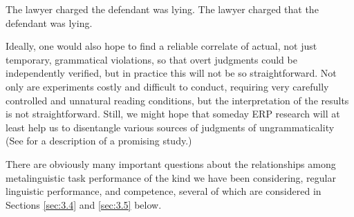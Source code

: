 \ea\label{ex:3:2}
\ea The lawyer charged the defendant was lying.
\ex The lawyer charged that the defendant was lying.
\z
\z

\noindent
Ideally, one would also hope to find a reliable  correlate of actual, not just temporary, grammatical violations, so that overt judgments could be independently verified, but in practice this will not be so straightforward. Not only are  experiments costly and difficult to conduct, requiring very carefully controlled and unnatural reading conditions, but the interpretation of the results is not straightforward.  Still, we  might  hope  that  someday  ERP research  will  at least
help us to disentangle various sources of judgments of ungrammaticality (See  for a description of a promising study.)

There are obviously many important questions about the relationships among metalinguistic task performance of the kind we have been considering, regular linguistic performance, and competence, several of which are considered in Sections \ref{sec:3.4} and \ref{sec:3.5} below.
